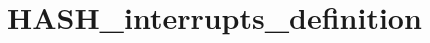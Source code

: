 \hypertarget{group___h_a_s_h__interrupts__definition}{\section{H\-A\-S\-H\-\_\-interrupts\-\_\-definition}
\label{group___h_a_s_h__interrupts__definition}
}
